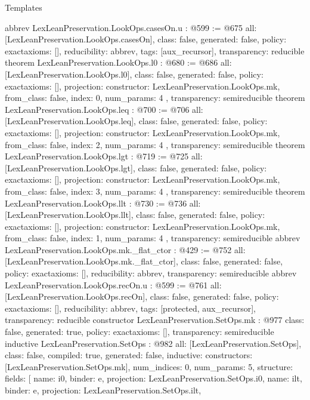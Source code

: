 \begin{lexlean}{Templates}
\begin{coremodule}
{}
abbrev LexLeanPreservation.LookOps.casesOn.{u} : @599 := @675 {
  all: [LexLeanPreservation.LookOps.casesOn],
  class: false,
  generated: false,
  policy: exact{axioms: []},
  reducibility: abbrev{},
  tags: [aux_recursor],
  transparency: reducible
}
theorem LexLeanPreservation.LookOps.l0 : @680 := @686 {
  all: [LexLeanPreservation.LookOps.l0],
  class: false,
  generated: false,
  policy: exact{axioms: []},
  projection: {
    constructor: LexLeanPreservation.LookOps.mk,
    from_class: false,
    index: 0,
    num_params: 4
  },
  transparency: semireducible
}
theorem LexLeanPreservation.LookOps.leq : @700 := @706 {
  all: [LexLeanPreservation.LookOps.leq],
  class: false,
  generated: false,
  policy: exact{axioms: []},
  projection: {
    constructor: LexLeanPreservation.LookOps.mk,
    from_class: false,
    index: 2,
    num_params: 4
  },
  transparency: semireducible
}
theorem LexLeanPreservation.LookOps.lgt : @719 := @725 {
  all: [LexLeanPreservation.LookOps.lgt],
  class: false,
  generated: false,
  policy: exact{axioms: []},
  projection: {
    constructor: LexLeanPreservation.LookOps.mk,
    from_class: false,
    index: 3,
    num_params: 4
  },
  transparency: semireducible
}
theorem LexLeanPreservation.LookOps.llt : @730 := @736 {
  all: [LexLeanPreservation.LookOps.llt],
  class: false,
  generated: false,
  policy: exact{axioms: []},
  projection: {
    constructor: LexLeanPreservation.LookOps.mk,
    from_class: false,
    index: 1,
    num_params: 4
  },
  transparency: semireducible
}
abbrev LexLeanPreservation.LookOps.mk._flat_ctor : @429 := @752 {
  all: [LexLeanPreservation.LookOps.mk._flat_ctor],
  class: false,
  generated: false,
  policy: exact{axioms: []},
  reducibility: abbrev{},
  transparency: semireducible
}
abbrev LexLeanPreservation.LookOps.recOn.{u} : @599 := @761 {
  all: [LexLeanPreservation.LookOps.recOn],
  class: false,
  generated: false,
  policy: exact{axioms: []},
  reducibility: abbrev{},
  tags: [protected, aux_recursor],
  transparency: reducible
}
constructor LexLeanPreservation.SetOps.mk : @977 {
  class: false,
  generated: true,
  policy: exact{axioms: []},
  transparency: semireducible
}
inductive LexLeanPreservation.SetOps : @982 {
  all: [LexLeanPreservation.SetOps],
  class: false,
  compiled: true,
  generated: false,
  inductive: {
    constructors: [LexLeanPreservation.SetOps.mk],
    num_indices: 0,
    num_params: 5,
    structure: {
      fields: [
        {name: i0, binder: e, projection: LexLeanPreservation.SetOps.i0},
        {name: ilt, binder: e, projection: LexLeanPreservation.SetOps.ilt},
}}}
\end{coremodule}
\end{lexlean}
